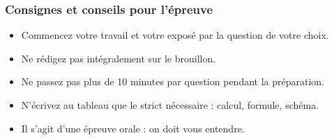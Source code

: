 \documentclass[french]{beamer}
\begin{document}
\begin{frame}
  \frametitle{Consignes et conseils pour l'épreuve}

  \begin{block}{}
    \begin{itemize}
      \item Commencez votre travail et votre exposé par la question de votre
        choix.
      \item Ne rédigez pas intégralement sur le brouillon.
      \item Ne passez pas plus de 10 minutes par question pendant la
        préparation.
      \item N'écrivez au tableau que le strict nécessaire : calcul, formule,
        schéma.
      \item Il s'agit d'une épreuve orale : on doit vous entendre.
    \end{itemize}
  \end{block}
\end{frame}
\end{document}
